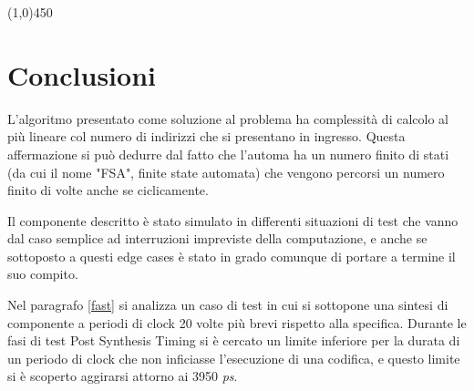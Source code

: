 \documentclass{article}
\begin{document}
\bigskip
\bigskip


\begin{center}
\line(1,0){450}
\end{center}



\newpage


\section{Conclusioni}
L'algoritmo presentato come soluzione al problema ha complessità di calcolo al più lineare col numero di indirizzi che si presentano in ingresso. Questa affermazione si può dedurre dal fatto che l'automa ha un numero finito di stati (da cui il nome "FSA", finite state automata) che vengono percorsi un numero finito di volte anche se ciclicamente.

\smallskip

Il componente descritto è stato simulato in differenti situazioni di test che vanno dal caso semplice ad interruzioni impreviste della computazione, e anche se sottoposto a questi edge cases è stato in grado comunque di portare a termine il suo compito.

\smallskip

Nel paragrafo \ref{fast} si analizza un caso di test in cui si sottopone una sintesi di componente a periodi di clock 20 volte più brevi rispetto alla specifica. Durante le fasi di test Post Synthesis Timing si è cercato un limite inferiore per la durata di un periodo di clock che non inficiasse l'esecuzione di una codifica, e questo limite si è scoperto aggirarsi attorno ai 3950 \emph{ps}.
\end{document}
